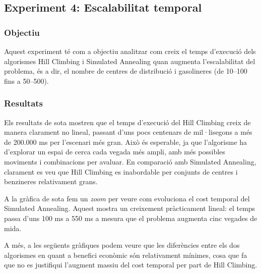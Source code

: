 
\subsection{Experiment 4: Escalabilitat temporal}

\vspace{0.75cm}

\subsubsection{Objectiu}

Aquest experiment té com a objectiu analitzar com creix el temps d’execució dels algorismes Hill Climbing i Simulated Annealing quan augmenta l’escalabilitat del problema, és a dir, el nombre de centres de distribució i gasolineres (de 10–100 fins a 50–500).


\subsubsection{Resultats}


Els resultats de sota mostren que el temps d’execució del Hill Climbing creix de manera clarament no lineal, passant d’uns pocs centenars de mil·lisegons a més de 200.000 ms per l’escenari més gran. Això és esperable, ja que l’algorisme ha d’explorar un espai de cerca cada vegada més ampli, amb més possibles moviments i combinacions per avaluar. En comparació amb Simulated Annealing, clarament es veu que Hill Climbing es inabordable per conjunts de centres i benzineres relativament grans.

\vspace{0.5cm}



\vspace{0.5cm}



\vspace{0.5cm}

A la gràfica de sota fem un \textit{zoom} per veure com evoluciona el cost temporal del Simulated Annealing. Aquest mostra un creixement pràcticament lineal: el temps passa d’uns 100 ms a 550 ms a mesura que el problema augmenta cinc vegades de mida.

\vspace{0.5cm}



\vspace{0.5cm}

A més, a les següents gràfiques podem veure que les diferències entre els dos algorismes en quant a benefici econòmic són relativament mínimes, cosa que fa que no es justifiqui l'augment massiu del cost temporal per part de Hill Climbing.

\vspace{0.5cm}



\vspace{0.5cm}

